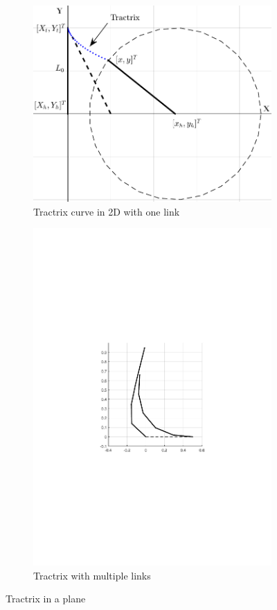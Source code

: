 \documentclass[12pt,a4]{article}
\begin{document}
\begin{figure}[ht!]
    \centering
    \begin{subfigure}{0.48\textwidth}
        \centering
        \includegraphics[width=\linewidth]{figures/fig1.pdf}
        \caption{Tractrix curve in 2D with one link}
        \label{fig:tractrixin2D}
    \end{subfigure}%
    \begin{subfigure}{0.48\textwidth}
        \centering
        \includegraphics[width=0.75\linewidth]{figures/fig2.pdf}
        \caption{Tractrix with multiple links}
        \label{fig:attenuation_of Motion}
    \end{subfigure}
\caption{Tractrix in a plane}
\end{figure}
\end{document}
